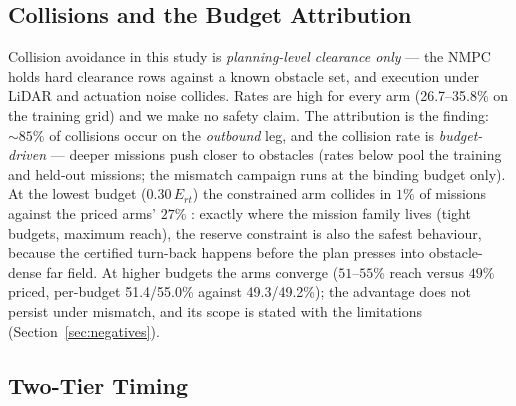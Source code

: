 \documentclass[preprint,12pt]{elsarticle}
\begin{document}
\subsection{Collisions and the Budget Attribution}
\label{sec:collisions}

Collision avoidance in this study is \emph{planning-level clearance
only} --- the NMPC holds hard clearance rows against a known obstacle
set, and execution under LiDAR and actuation noise collides. Rates
are high for every arm (26.7--35.8\% on the training grid) and we
make no safety claim. The attribution is the finding: ${\sim}85\%$ of
collisions occur on the \emph{outbound} leg, and the collision rate is
\emph{budget-driven} --- deeper missions push closer to obstacles
(rates below pool the training and held-out missions; the mismatch
campaign runs at the binding budget only).
At
the lowest budget ($0.30\,E_{rt}$) the constrained arm collides in
$1\%$ of missions against the priced arms' $27\%$
: exactly where the mission family lives (tight budgets, maximum
reach), the reserve constraint is also the safest behaviour, because
the certified turn-back happens before the plan presses into
obstacle-dense far field. At higher budgets the arms converge
($51$--$55\%$ reach versus $49\%$ priced, per-budget 51.4/55.0\% against 49.3/49.2\%); the advantage does not persist under
mismatch, and its scope is stated with the limitations
(Section~\ref{sec:negatives}).

\subsection{Two-Tier Timing}
\label{sec:timing}
\end{document}

